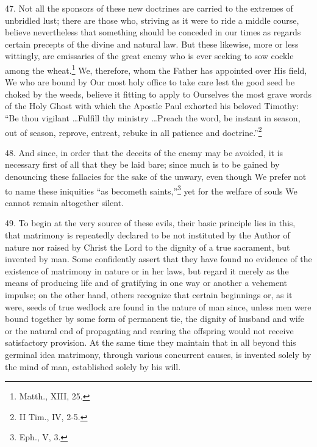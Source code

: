 \documentclass[12pt,a4paper]{book}
\begin{document}
47. Not all the sponsors of these new doctrines are carried to the extremes of unbridled lust; there are those who, striving as it were to ride a middle course, believe nevertheless that something should be conceded in our times as regards certain precepts of the divine and natural law. But these likewise, more or less wittingly, are emissaries of the great enemy who is ever seeking to sow cockle among the wheat.\footnote{Matth., XIII, 25.} We, therefore, whom the Father has appointed over His field, We who are bound by Our most holy office to take care lest the good seed be choked by the weeds, believe it fitting to apply to Ourselves the most grave words of the Holy Ghost with which the Apostle Paul exhorted his beloved Timothy: ``Be thou vigilant \ldots Fulfill thy ministry \ldots Preach the word, be instant in season, out of season, reprove, entreat, rebuke in all patience and doctrine.''\footnote{II Tim., IV, 2-5.}

48. And since, in order that the deceits of the enemy may be avoided, it is necessary first of all that they be laid bare; since much is to be gained by denouncing these fallacies for the sake of the unwary, even though We prefer not to name these iniquities ``as becometh saints,''\footnote{Eph., V, 3.} yet for the welfare of souls We cannot remain altogether silent.

49. To begin at the very source of these evils, their basic principle lies in this, that matrimony is repeatedly declared to be not instituted by the Author of nature nor raised by Christ the Lord to the dignity of a true sacrament, but invented by man. Some confidently assert that they have found no evidence of the existence of matrimony in nature or in her laws, but regard it merely as the means of producing life and of gratifying in one way or another a vehement impulse; on the other hand, others recognize that certain beginnings or, as it were, seeds of true wedlock are found in the nature of man since, unless men were bound together by some form of permanent tie, the dignity of husband and wife or the natural end of propagating and rearing the offspring would not receive satisfactory provision. At the same time they maintain that in all beyond this germinal idea matrimony, through various concurrent causes, is invented solely by the mind of man, established solely by his will.
\end{document}
